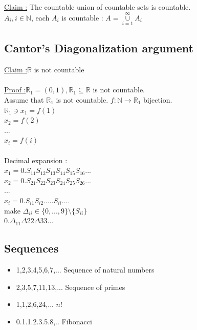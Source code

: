\documentclass[12pt,a4paper]{article}
\begin{document}
\underline{Claim :} The countable union of countable sets is countable.\\
$A_i , i \in \mathbb{N}$, each $A_i$ is countable : $A = \underset{i = 1}{\overset{\infty}{\cup}} A_i$\\
\subsection{Cantor's Diagonalization argument}
\underline{Claim :}$\mathbb{R}$ is not countable\\
\\
\underline{Proof :}$\mathbb{R}_1 = (0,1), \mathbb{R}_1 \subseteq \mathbb{R}$ is not countable.\\
Assume that $\mathbb{R}_1$ is not countable. $f: \mathbb{N} \rightarrow \mathbb{R}_1$ bijection.\\
$\mathbb{R}_1 \ni x_1 = f(1)$\\
$x_2 = f(2)$\\
...\\
$x_i = f(i)$\\
\\Decimal expansion :\\
$x_1 = 0.S_{11}S_{12}S_{13}S_{14}S_{15}S_{16}...$\\
$x_2 = 0.S_{21}S_{22}S_{23}S_{24}S_{25}S_{26}...$\\
...\\
$x_i = 0.S_{i1}S_{i2}.....S_{ii}....$\\
make $\Delta_{ii} \in \{0,...,9\}\setminus\{S_{ii}\}$\\
$0.\Delta_{11}\Delta{22}\Delta{33}...$
\subsection{Sequences}
\begin{center}
\end{center}
 
\begin{itemize}
	\item 1,2,3,4,5,6,7,... Sequence of natural numbers
	\item 2,3,5,7,11,13,... Sequence of primes
	\item 1,1,2,6,24,... $n!$
	\item 0.1.1.2.3.5.8,.. Fibonacci
\end{itemize}
\begin{center}
\end{center}
\end{document}
